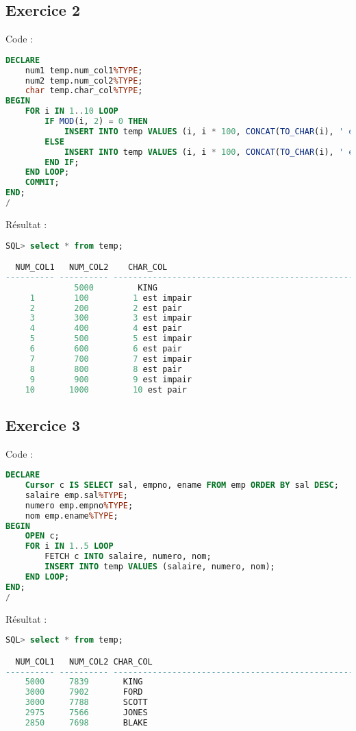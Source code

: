 \documentclass{article}
\begin{document}
\subsection{Exercice 2}
Code :
\begin{lstlisting}[language=SQL,
    deletekeywords={char},
    morekeywords={DECLARE, LOOP, TYPE, FOR, IF, IS, OPEN, FETCH, DBMS_OUTPUT, PUT_LINE}]
DECLARE
    num1 temp.num_col1%TYPE;
    num2 temp.num_col2%TYPE;
    char temp.char_col%TYPE;
BEGIN
	FOR i IN 1..10 LOOP
		IF MOD(i, 2) = 0 THEN
			INSERT INTO temp VALUES (i, i * 100, CONCAT(TO_CHAR(i), ' est pair'));
		ELSE
			INSERT INTO temp VALUES (i, i * 100, CONCAT(TO_CHAR(i), ' est impair'));
		END IF;
	END LOOP;
	COMMIT;
END;
/
\end{lstlisting}

Résultat :
\begin{lstlisting}[language=SQL,
    morekeywords={DECLARE, LOOP, TYPE, FOR, IF, IS, OPEN, FETCH, DBMS_OUTPUT, PUT_LINE}]
SQL> select * from temp;

  NUM_COL1   NUM_COL2    CHAR_COL
---------- ---------- -------------------------------------------------------
		      5000         KING
	 1	      100         1 est impair
	 2	      200         2 est pair
	 3	      300         3 est impair
	 4	      400         4 est pair
	 5	      500         5 est impair
	 6	      600         6 est pair
	 7	      700         7 est impair
	 8	      800         8 est pair
	 9	      900         9 est impair
	10	     1000         10 est pair
\end{lstlisting}

\subsection{Exercice 3}
Code :
\begin{lstlisting}[language=SQL,
    deletekeywords={char},
    morekeywords={DECLARE, LOOP, TYPE, FOR, IF, IS, OPEN, FETCH, DBMS_OUTPUT, PUT_LINE}]
DECLARE
	Cursor c IS SELECT sal, empno, ename FROM emp ORDER BY sal DESC;
	salaire emp.sal%TYPE;
	numero emp.empno%TYPE;
	nom emp.ename%TYPE;
BEGIN
	OPEN c;
	FOR i IN 1..5 LOOP
		FETCH c INTO salaire, numero, nom;
		INSERT INTO temp VALUES (salaire, numero, nom);
	END LOOP;
END;
/
\end{lstlisting}

Résultat :
\begin{lstlisting}[language=SQL,
    morekeywords={DECLARE, LOOP, TYPE, FOR, IF, IS, OPEN, FETCH, DBMS_OUTPUT, PUT_LINE}]
SQL> select * from temp;

  NUM_COL1   NUM_COL2 CHAR_COL
---------- ---------- -------------------------------------------------------
    5000	 7839       KING
    3000	 7902       FORD
    3000	 7788       SCOTT
    2975	 7566       JONES
    2850	 7698       BLAKE
\end{lstlisting}
\end{document}

